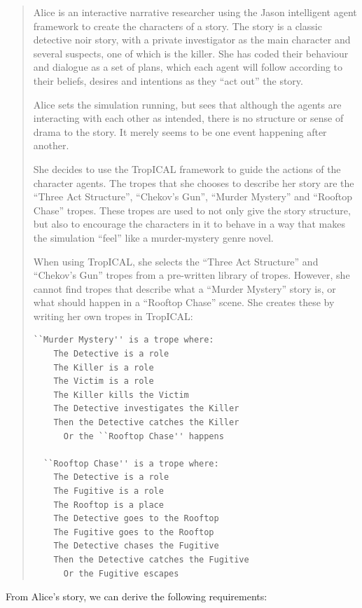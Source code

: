 \documentclass[11pt]{report}
\begin{document}
\begin{quote}
  Alice is an interactive narrative researcher using the Jason intelligent agent
  framework to create the characters of a story. The story is a classic
  detective noir story, with a private investigator as the main character and
  several suspects, one of which is the killer. She has coded their behaviour
  and dialogue as a set of plans, which each agent will follow according to
  their beliefs, desires and intentions as they ``act out'' the story.

  Alice sets the simulation running, but sees that although the agents are interacting
  with each other as intended, there is no structure or sense of drama to the
  story. It merely seems to be one event happening after another.

  She decides to use the TropICAL framework to guide the actions of the
  character agents. The tropes that she chooses to describe her story are the
  ``Three Act Structure'', ``Chekov's Gun'', ``Murder Mystery'' and ``Rooftop
  Chase'' tropes. These tropes are used to not only give the story structure,
  but also to encourage the characters in it to behave in a way that makes the
  simulation ``feel'' like a murder-mystery genre novel.

  When using TropICAL, she selects the ``Three Act Structure'' and ``Chekov's
  Gun'' tropes from a pre-written library of tropes. However, she cannot find
  tropes that describe what a ``Murder Mystery'' story is, or what should happen
  in a ``Rooftop Chase'' scene. She creates these by writing her own tropes in TropICAL:

  \begin{lstlisting}[showstringspaces=false]
  ``Murder Mystery'' is a trope where:
    The Detective is a role
    The Killer is a role
    The Victim is a role
    The Killer kills the Victim
    The Detective investigates the Killer
    Then the Detective catches the Killer
      Or the ``Rooftop Chase'' happens

  ``Rooftop Chase'' is a trope where:
    The Detective is a role
    The Fugitive is a role
    The Rooftop is a place
    The Detective goes to the Rooftop
    The Fugitive goes to the Rooftop
    The Detective chases the Fugitive
    Then the Detective catches the Fugitive
      Or the Fugitive escapes
\end{lstlisting}
\end{quote}

From Alice's story, we can derive the following requirements:
\end{document}
